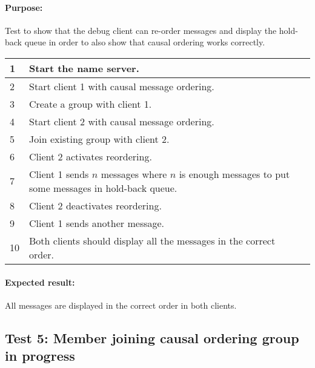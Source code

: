 \paragraph{Purpose: } Test to show that the debug client can re-order messages and display the hold-back queue in order to also show that causal ordering works correctly.

\begin{table}[h!]
	\begin{tabularx}{\textwidth}{|l|X|p{8pt}|}
		\hline
		1 & Start the name server. & \\
		\hline
		2 & Start client 1 with causal message ordering. & \\
		\hline
		3 & Create a group with client 1. & \\
		\hline
		4 & Start client 2 with causal message ordering. & \\
		\hline
		5 & Join existing group with client 2.& \\
		\hline
		6 & Client 2 activates reordering. & \\
		\hline
		7 & Client 1 sends $n$ messages where $n$ is enough messages to put some messages in hold-back queue. & \\
		\hline
		8 & Client 2 deactivates reordering. & \\		
		\hline
		9 & Client 1 sends another message. & \\
		\hline
		10 & Both clients should display all the messages in the correct order. & \\
		\hline
	\end{tabularx}
\end{table}

\paragraph{Expected result:} All messages are displayed in the correct order in both clients.

\subsection*{Test 5: Member joining causal ordering group in progress}
